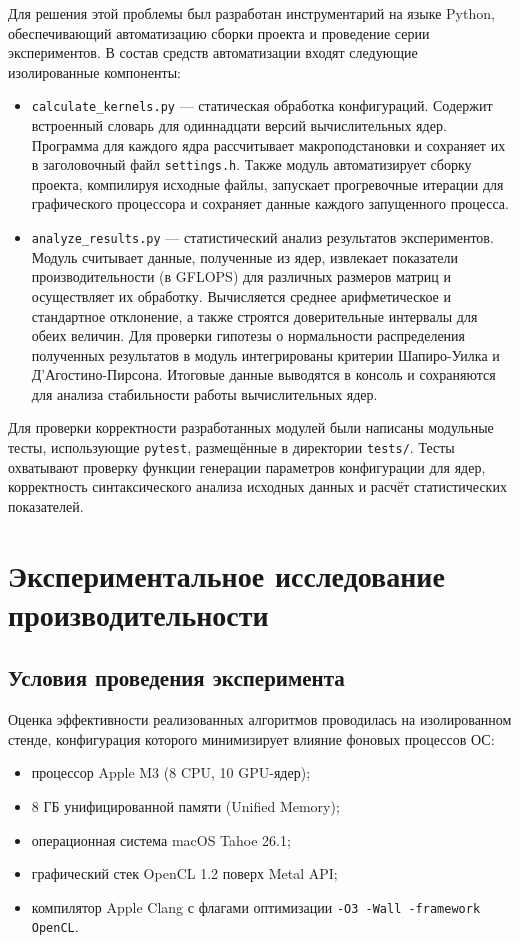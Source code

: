 \documentclass[a4paper]{article}
\begin{document}
Для решения этой проблемы был разработан инструментарий на языке Python, обеспечивающий автоматизацию сборки проекта и проведение серии экспериментов. В состав средств автоматизации входят следующие изолированные компоненты:
\begin{itemize}[noitemsep, topsep=0pt]
    \item \texttt{calculate\_kernels.py} --- статическая обработка конфигураций. Содержит встроенный словарь для одиннадцати версий вычислительных ядер. Программа для каждого ядра рассчитывает макроподстановки и сохраняет их в заголовочный файл \texttt{settings.h}. Также модуль автоматизирует сборку проекта, компилируя исходные файлы, запускает прогревочные итерации для графического процессора и сохраняет данные каждого запущенного процесса.
    \item \texttt{analyze\_results.py} --- статистический анализ результатов экспериментов. Модуль считывает данные, полученные из ядер, извлекает показатели производительности (в GFLOPS) для различных размеров матриц и осуществляет их обработку. Вычисляется среднее арифметическое и стандартное отклонение, а также строятся доверительные интервалы для обеих величин. Для проверки гипотезы о нормальности распределения полученных результатов в модуль интегрированы критерии Шапиро-Уилка и Д'Агостино-Пирсона. Итоговые данные выводятся в консоль и сохраняются для анализа стабильности работы вычислительных ядер.
\end{itemize}

Для проверки корректности разработанных модулей были написаны модульные тесты, использующие \texttt{pytest}, размещённые в директории \texttt{tests/}. Тесты охватывают проверку функции генерации параметров конфигурации для ядер, корректность синтаксического анализа исходных данных и расчёт статистических показателей.

\section{Экспериментальное исследование производительности}

\subsection{Условия проведения эксперимента}

Оценка эффективности реализованных алгоритмов проводилась на изолированном стенде, конфигурация которого минимизирует влияние фоновых процессов ОС:
\begin{itemize}
    \item процессор Apple M3 (8 CPU, 10 GPU-ядер);
    \item 8 ГБ унифицированной памяти (Unified Memory);
    \item операционная система macOS Tahoe 26.1;
    \item графический стек OpenCL 1.2 поверх Metal API;
    \item компилятор Apple Clang с флагами оптимизации \texttt{-O3 -Wall -framework OpenCL}.
\end{itemize}
\end{document}
